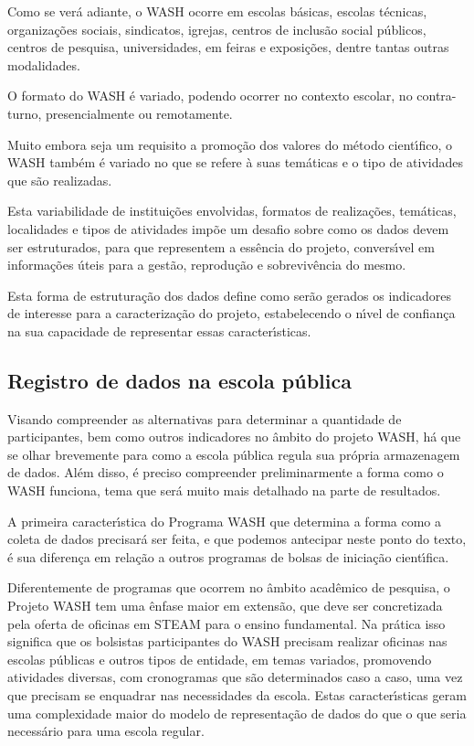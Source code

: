 \documentclass[
12pt,		%
openright,	%
twoside,  %
a4paper,			%
chapter=TITLE,		%
english,			%
french,				%
spanish,			%
brazil				%
]{USPSC-classe/USPSC}
\begin{document}
Como se ver\'a adiante, o WASH ocorre  em escolas b\'asicas, escolas t\'ecnicas, organiza\c{c}\~oes sociais, sindicatos, igrejas, centros de inclus\~ao social p\'ublicos, centros de pesquisa, universidades, em feiras e exposi\c{c}\~oes, dentre tantas outras modalidades.


O formato do WASH \'e variado, podendo ocorrer no contexto escolar, no contra-turno, presencialmente ou remotamente.


Muito embora seja um requisito a promo\c{c}\~ao dos valores do m\'etodo cient\'{\i}fico, o WASH tamb\'em \'e variado no que se refere \`a suas tem\'aticas e o tipo de atividades que s\~ao realizadas.


Esta variabilidade de institui\c{c}\~oes envolvidas, formatos de realiza\c{c}\~oes, tem\'aticas, localidades e tipos de atividades imp\~oe um desafio sobre como os dados devem ser estruturados, para que representem a ess\^encia do projeto, convers\'{\i}vel em informa\c{c}\~oes \'uteis para a gest\~ao, reprodu\c{c}\~ao e sobreviv\^encia do mesmo.


Esta forma de estrutura\c{c}\~ao dos dados define como ser\~ao gerados os indicadores de interesse para a caracteriza\c{c}\~ao do projeto, estabelecendo o n\'{\i}vel de confian\c{c}a na sua capacidade de representar essas caracter\'{\i}sticas.


\subsection[Registro de dados na escola p\'ublica]{Registro de dados na escola p\'ublica}\label{Registro de dados na escola p\'ublica}
Visando compreender as alternativas para determinar a quantidade de participantes, bem como outros indicadores no \^ambito do projeto WASH, h\'a que se olhar brevemente para como a escola p\'ublica regula sua pr\'opria armazenagem de dados. Al\'em disso, \'e preciso compreender preliminarmente a forma como o WASH funciona, tema que ser\'a muito mais detalhado na parte de resultados.


A primeira caracter\'{\i}stica do Programa WASH que determina a forma como a coleta de dados precisar\'a ser feita, e que podemos antecipar neste ponto do texto, \'e sua diferen\c{c}a em rela\c{c}\~ao a outros programas de bolsas de inicia\c{c}\~ao cient\'{\i}fica.


Diferentemente de programas que ocorrem no \^ambito acad\^emico de pesquisa, o Projeto WASH tem uma \^enfase maior em extens\~ao, que deve ser concretizada pela oferta de oficinas em STEAM para o ensino fundamental. Na pr\'atica isso significa que os bolsistas participantes do WASH precisam realizar oficinas nas escolas p\'ublicas e outros tipos de entidade, em temas variados, promovendo atividades diversas, com cronogramas que s\~ao determinados caso a caso, uma vez que precisam se enquadrar nas necessidades da escola. Estas caracter\'{\i}sticas geram uma complexidade maior do modelo de representa\c{c}\~ao de dados do que o que seria necess\'ario para uma escola regular.
\end{document}

